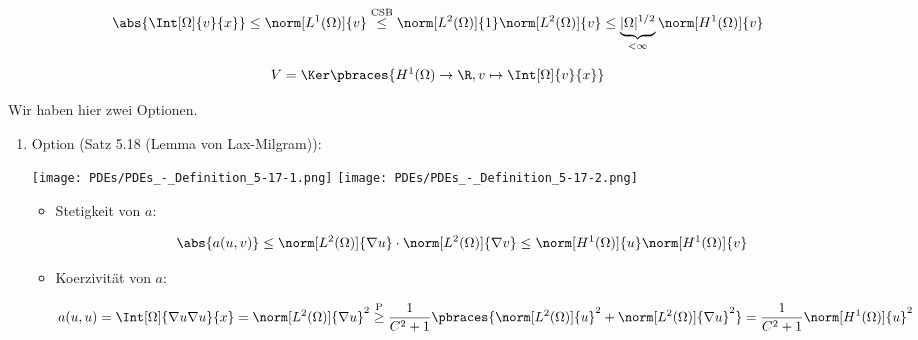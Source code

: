 \begin{solution}
\begin{enumerate}[label = \alph*)]
    \begin{align*}
        \abs{\Int[\Omega]{v}{x}}
        \leq
        \norm[L^1(\Omega)]{v}
        \stackrel
        {
            \mathrm{CSB}
        }{\leq}
        \norm[L^2(\Omega)]{1} \norm[L^2(\Omega)]{v}
        \leq
        \underbrace{|\Omega|^{1/2}}_{<\infty} \norm[H^1(\Omega)]{v}
    \end{align*}

    \begin{align*}
        V = \Ker \pbraces{H^1(\Omega) \to \R, v \mapsto \Int[\Omega]{v}{x}}
    \end{align*}

    Wir haben hier zwei Optionen.

    \begin{enumerate}[label = \arabic*.]

        \item Option (Satz 5.18 (Lemma von Lax-Milgram)):

        \begin{center}
            \texttt{[image: PDEs/PDEs\_-\_Definition\_5-17-1.png]}
            \texttt{[image: PDEs/PDEs\_-\_Definition\_5-17-2.png]}
        \end{center}


        \begin{itemize}

            \item Stetigkeit von $a$:

            \begin{align*}
                \abs{a(u, v)}
                \leq
                \norm[L^2(\Omega)]{\nabla u} \cdot \norm[L^2(\Omega)]{\nabla v}
                \leq
                \norm[H^1(\Omega)]{u} \norm[H^1(\Omega)]{v}
            \end{align*}

            \item Koerzivität von $a$:

            \begin{align*}
                a(u, u)
                =
                \Int[\Omega]{\nabla u \nabla u}{x}
                =
                \norm[L^2(\Omega)]{\nabla u}^2
                \stackrel
                {
                    \mathrm{P}
                }{\geq}
                \frac{1}{C^2 + 1}
                \pbraces
                {
                   \norm[L^2(\Omega)]{u}^2 + \norm[L^2(\Omega)]{\nabla u}^2
                }
                =
                \frac{1}{C^2 + 1} \norm[H^1(\Omega)]{u}^2
            \end{align*}


\end{itemize}
\end{enumerate}
\end{enumerate}
\end{solution}

